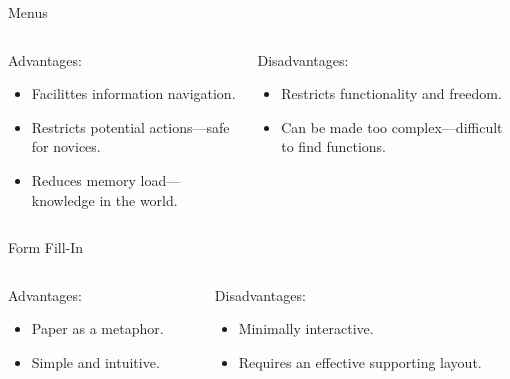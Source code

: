 \begin{frame}{Menus}
	\begin{columns}[onlytextwidth]
		\begin{column}{0.45\textwidth}
			Advantages:
	
			\begin{itemize}
				\item Facilittes information navigation.
				\item Restricts potential actions---safe for novices.
				\item Reduces memory load---knowledge in the world.
			\end{itemize}
		\end{column}
		\begin{column}{0.45\textwidth}
			Disadvantages:
	
			\begin{itemize}
				\item Restricts functionality and freedom.
				\item Can be made too complex---difficult to find functions.
			\end{itemize}
		\end{column}
	\end{columns}	
\end{frame}

\begin{frame}{Form Fill-In}
	\begin{columns}[onlytextwidth]
		\begin{column}{0.45\textwidth}
			Advantages:
	
			\begin{itemize}
				\item Paper as a metaphor.
				\item Simple and intuitive.
			\end{itemize}
		\end{column}
		\begin{column}{0.45\textwidth}
			Disadvantages:
	
			\begin{itemize}
				\item Minimally interactive.
				\item Requires an effective supporting layout.
			\end{itemize}
		\end{column}
	\end{columns}	
\end{frame}

